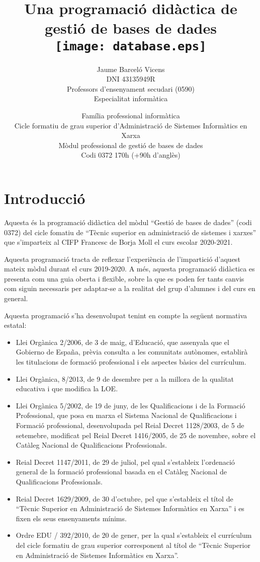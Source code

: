 \documentclass[catalan, a4paper, 12pt, titlepage]{article}
\title{Una programació didàctica de \\
gestió de bases de dades\\
        \vspace{10mm}
	\texttt{[image: database.eps]}
	}
\author{
	Jaume Barceló Vicens\\
	DNI 43135949R\\
	Professors d'ensenyament secudari (0590)\\
	Especialitat informàtica}
\date{
	Família professional informàtica \\
	Cicle formatiu de grau superior d’Administració de Sistemes Informàtics en Xarxa\\
	Mòdul professional de gestió de bases de dades\\
	Codi 0372 170h (+90h d'anglès)}
\begin{document}
\maketitle

\tableofcontents 

\section{Introducció}

Aquesta és la programació didàctica del mòdul ``Gestió de bases de dades'' (codi 0372) del cicle fomatiu de ``Tècnic superior en administració de sistemes i xarxes'' que s'imparteix al CIFP Francesc de Borja Moll el curs escolar 2020-2021.

Aquesta programació tracta de reflexar l'experiència de l'impartició d'aquest mateix mòdul durant el curs 2019-2020. A més, aquesta programació didàctica es presenta com una guia oberta i flexible, sobre la que es poden fer tants canvis com siguin necessaris per adaptar-se a la realitat del grup d'alumnes i del curs en general.

Aquesta programació s'ha desenvolupat tenint en compte la següent normativa estatal:
\begin{itemize}
	\item Llei Orgànica 2/2006, de 3 de maig, d'Educació, que assenyala que el Gobierno de España, prèvia consulta a les comunitats autònomes, establirà les titulacions de formació professional i els aspectes bàsics del currículum.
	\item Llei Orgànica, 8/2013, de 9 de desembre per a la millora de la qualitat educativa i que modifica la LOE.
	\item Llei Orgànica 5/2002, de 19 de juny, de les Qualificacions i de la Formació Professional, que posa en marxa el Sistema Nacional de Qualificacions i Formació professional, desenvolupada pel Reial Decret 1128/2003, de 5 de setemebre, modificat pel Reial Decret 1416/2005, de 25 de novembre, sobre el Catàleg Nacional de Qualificacions Professionals.
	\item Reial Decret 1147/2011, de 29 de juliol, pel qual s'estableix l'ordenació general de la formació professional basada en el Catàleg Nacional de Qualificacions Professionals.
	\item Reial Decret 1629/2009, de 30 d'octubre, pel que s'estableix el títol de ``Tècnic Superior en Administració de Sistemes Informàtics en Xarxa'' i es fixen els seus ensenyaments mínims.
	\item Ordre EDU / 392/2010, de 20 de gener, per la qual s'estableix el currículum del cicle formatiu de grau superior corresponent al títol de ``Tècnic Superior en Administració de Sistemes Informàtics en Xarxa''.
\end{itemize}
\end{document}
